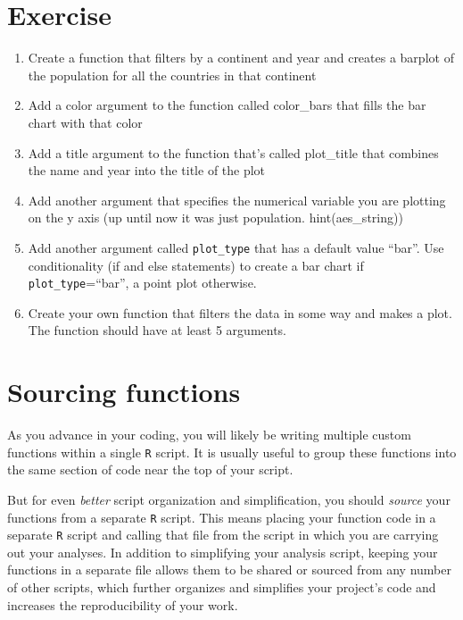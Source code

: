 \documentclass[
]{book}
\begin{document}
\hypertarget{exercise-3}{%
\section*{Exercise}\label{exercise-3}}

\begin{enumerate}
\def\labelenumi{\arabic{enumi})}
\item
  Create a function that filters by a continent and year and creates a barplot of the population for all the countries in that continent
\item
  Add a color argument to the function called color\_bars that fills the bar chart with that color
\item
  Add a title argument to the function that's called plot\_title that combines the name and year into the title of the plot
\item
  Add another argument that specifies the numerical variable you are plotting on the y axis (up until now it was just population. hint(aes\_string))
\item
  Add another argument called \texttt{plot\_type} that has a default value ``bar''. Use conditionality (if and else statements) to create a bar chart if \texttt{plot\_type}=``bar'', a point plot otherwise.
\item
  Create your own function that filters the data in some way and makes a plot. The function should have at least 5 arguments.
\end{enumerate}

\hypertarget{sourcing-functions}{%
\section*{Sourcing functions}\label{sourcing-functions}}

As you advance in your coding, you will likely be writing multiple custom functions within a single \texttt{R} script. It is usually useful to group these functions into the same section of code near the top of your script.

But for even \emph{better} script organization and simplification, you should \emph{source} your functions from a separate \texttt{R} script. This means placing your function code in a separate \texttt{R} script and calling that file from the script in which you are carrying out your analyses. In addition to simplifying your analysis script, keeping your functions in a separate file allows them to be shared or sourced from any number of other scripts, which further organizes and simplifies your project's code and increases the reproducibility of your work.
\end{document}
